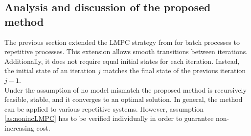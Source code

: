 \subsection{Analysis and discussion of the proposed method}
The previous section extended the LMPC strategy from \cite{Rosolia2016} for batch processes to repetitive processes. This extension allows smooth transitions between iterations. Additionally, it does not require equal initial states for each iteration. Instead, the initial state of an iteration $j$ matches the final state of the previous iteration $j-1$.\\
Under the assumption of no model mismatch the proposed method is recursively feasible, stable, and it converges to an optimal solution. In general, the method can be applied to various repetitive systems. However, assumption \ref{as:nonincLMPC} has to be verified individually in order to guarantee non-increasing cost.


